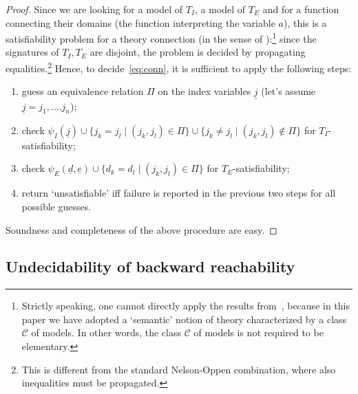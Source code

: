 \documentclass{LMCS}
\newcommand{\ud}{\ensuremath{\underline d}}
\newcommand{\ue}{\ensuremath{\underline e}}
\newcommand{\uj}{\ensuremath{\underline j}}
\theoremstyle{plain}\newtheorem{assumption}[thm]{Assumption}
\theoremstyle{plain}\newtheorem{proposition}[thm]{Proposition}
\theoremstyle{plain}\newtheorem{property}[thm]{Property}
\theoremstyle{plain}\newtheorem{example}[thm]{Example}
\theoremstyle{plain}\newtheorem{claim}[thm]{Claim}
\theoremstyle{plain}\newtheorem{lemma}[thm]{Lemma}
\begin{document}
\begin{proof}
  Since we are looking for a model of $T_I$, a model of $T_E$ and for
  a function connecting their domains (the function interpreting the
  variable $a$), this is a satisfiability problem for a theory
  connection (in the sense of \cite{BaGh}):\footnote{Strictly
    speaking, one cannot directly apply the results from~\cite{BaGh},
    because in this paper we have adopted a `semantic' notion of
    theory characterized by a class $\mathcal{C}$ of models.  In other
    words, the class $\mathcal{C}$ of models is not required to be
    elementary.} since the signatures of $T_I, T_E$ are disjoint, the
  problem is decided by propagating equalities.\footnote{This is
    different from the standard Nelson-Oppen combination, where also
    inequalities must be propagated.}  Hence, to
  decide~\eqref{eq:conn}, it is sufficient to apply the following
  steps:
  \begin{enumerate}[$-$]
  \item guess an equivalence relation $\Pi$ on the index variables
    $\uj$ (let's assume $\uj=j_1, \dots. j_n$);
  \item check $\psi_I(\uj) \cup \lbrace j_k=j_l \mid (j_k, j_l)\in
    \Pi\rbrace\cup \lbrace j_k\not= j_l \mid (j_k, j_l)\not \in
    \Pi\rbrace$ for $T_I$-satisfiability;
  \item check $\psi_E(\ud,\ue) \cup \lbrace d_k=d_l \mid (j_k,
    j_l)\in \Pi\rbrace$ for $T_E$-satisfiability;
  \item return `unsatisfiable' iff failure is reported in the
    previous two steps for all possible guesses.
  \end{enumerate}
  Soundness and completeness of the above procedure are easy.
\end{proof}


\subsection*{Undecidability of backward reachability}
\end{document}
